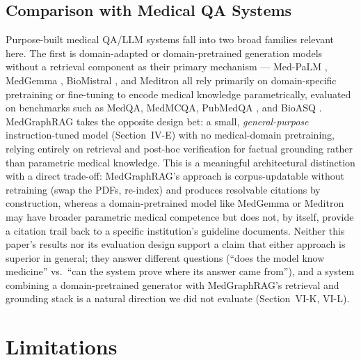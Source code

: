\documentclass[conference]{IEEEtran}
\begin{document}
\subsection{Comparison with Medical QA Systems}
Purpose-built medical QA/LLM systems fall into two broad families relevant here. The first is domain-adapted or domain-pretrained generation models without a retrieval component as their primary mechanism --- Med-PaLM \cite{singhal2023large}, MedGemma \cite{medgemma2025}, BioMistral \cite{labrak2024biomistral}, and Meditron \cite{chen2023meditron} all rely primarily on domain-specific pretraining or fine-tuning to encode medical knowledge parametrically, evaluated on benchmarks such as MedQA, MedMCQA, PubMedQA \cite{jin2019pubmedqa}, and BioASQ \cite{krithara2023bioasq}. MedGraphRAG takes the opposite design bet: a small, \emph{general-purpose} instruction-tuned model (Section~IV-E) with no medical-domain pretraining, relying entirely on retrieval and post-hoc verification for factual grounding rather than parametric medical knowledge. This is a meaningful architectural distinction with a direct trade-off: MedGraphRAG's approach is corpus-updatable without retraining (swap the PDFs, re-index) and produces resolvable citations by construction, whereas a domain-pretrained model like MedGemma or Meditron may have broader parametric medical competence but does not, by itself, provide a citation trail back to a specific institution's guideline documents. Neither this paper's results nor its evaluation design support a claim that either approach is superior in general; they answer different questions (``does the model know medicine'' vs.\ ``can the system prove where its answer came from''), and a system combining a domain-pretrained generator with MedGraphRAG's retrieval and grounding stack is a natural direction we did not evaluate (Section~VI-K, VI-L).

\section{Limitations}
\end{document}
